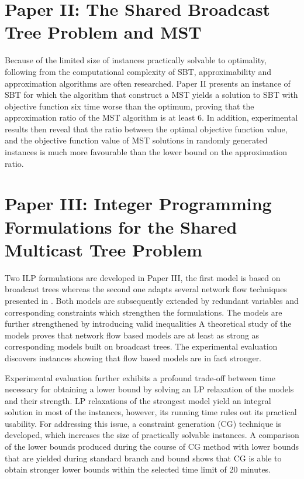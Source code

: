 %
%
\section{Paper II: The Shared Broadcast Tree Problem and MST}

Because of the limited size of instances practically solvable to optimality, following from the computational complexity of SBT, 
approximability and approximation algorithms are often researched.
Paper II presents an instance of SBT for which the algorithm that construct a MST yields a solution to SBT with objective function six time worse than the optimum, 
proving that the approximation ratio of the MST algorithm is at least 6.
In addition, experimental results then reveal that the ratio between the optimal objective function value,
and the objective function value of MST solutions in randomly generated instances is much  more favourable than the lower bound on the approximation ratio.

%
%
\section{Paper III: Integer Programming Formulations for the Shared Multicast Tree Problem}

Two ILP formulations are developed in Paper III, the first model is based on broadcast trees whereas the second one adapts several network flow techniques presented in \cite{polzin01}.
Both models are subsequently extended by redundant variables and corresponding constraints which strengthen the formulations.
The models are further strengthened by introducing valid inequalities
A theoretical study of the models proves that network flow based models are at least as strong as corresponding models built on broadcast trees.
The experimental evaluation discovers instances showing that flow based models are in fact stronger.

Experimental evaluation further exhibits a profound trade-off between time necessary for obtaining a lower bound by solving an LP relaxation of the models and their strength.
LP relaxations of the strongest model yield an integral solution in most of the instances, however, its running time rules out its practical usability.
For addressing this issue, a constraint generation (CG) technique is developed, which increases the size of practically solvable instances.
A comparison of the lower bounds produced during the course of CG method with lower bounds that are yielded during standard branch and bound shows 
that CG is able to obtain stronger lower bounds within the selected time limit of 20 minutes.

